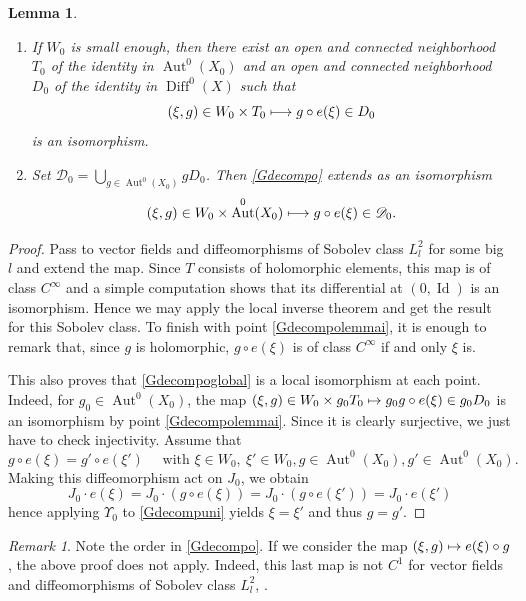 \documentclass[JEP,XML,SOM,Unicode]{cedram}
\let\mathcal\mathscr
\def\mto{\mathchoice{\longmapsto}{\mapsto}{\mapsto}{\mapsto}}
\DeclareMathOperator{\Aut}{Aut}
\DeclareMathOperator{\Diff}{Diff}
\DeclareMathOperator{\Id}{Id}
\theoremstyle{plain}
\newtheorem{lemma}[theorem]{Lemma}
\theoremstyle{definition}
\theoremstyle{remark}
\newtheorem{remark}[theorem]{Remark}
\numberwithin{equation}{section}
\newcommand{\Azero}{\Aut^0(X_0)}
\begin{document}
\skpt
\begin{lemma}
\label{Gdecompolemma}
\begin{enumerate}
\item\label{Gdecompolemmai}
If $W_0$ is small enough, then there exist an open and connected neighborhood~$T_0$ of the identity in $\Aut^0(X_0)$ and an open and connected neighborhood $D_0$ of the identity in $\Diff^0(X)$ such that
\begin{equation}
\label{Gdecompo}
(\xi,g)\in W_0\times T_0\mto g\circ e(\xi)\in D_0
\end{equation}
is an isomorphism.
\item\label{Gdecompolemmaii}
Set $\mathcal D_0=\bigcup_{g\in \Aut^0(X_0)}gD_0$. Then \eqref{Gdecompo} extends as an isomorphism
\begin{equation}
\label{Gdecompoglobal}
(\xi,g)\in W_0\times \Aut^0(X_0)\mto g\circ e(\xi)\in \mathcal D_0.
\end{equation}
\end{enumerate}
\end{lemma}

\begin{proof}
Pass to vector fields and diffeomorphisms of Sobolev class $L^2_l$ for some big~$l$ and extend the map. Since $T$ consists of holomorphic elements, this map is of class $C^\infty$ and a simple computation shows that its differential at $(0, \Id)$ is an isomorphism. Hence we may apply the local inverse theorem and get the result for this Sobolev class. To finish with point \eqref{Gdecompolemmai}, it is enough to remark that, since $g$ is holomorphic, $g\circ e(\xi)$ is of class $C^\infty$ if and only $\xi$ is.

This also proves that \eqref{Gdecompoglobal} is a local isomorphism at each point. Indeed, for $g_0\in \Azero$, the map $(\xi, g)\in W_0\times g_0T_0\mto g_0g\circ e(\xi)\in g_0D_0$ is an isomorphism by point \eqref{Gdecompolemmai}. Since it is clearly surjective, we just have to check injectivity. Assume that
\[
g\circ e(\xi)=g'\circ e(\xi')\quad\text{ with }\xi\in W_0,\ \xi'\in W_0, g\in \Aut^0(X_0), g'\in \Aut^0(X_0).
\]
Making this diffeomorphism act on $J_0$, we obtain
\begin{equation}
\label{Gdecompuni}
J_0\cdot e(\xi)=J_0\cdot (g\circ e(\xi))=J_0\cdot (g\circ e(\xi'))=J_0\cdot e(\xi')
\end{equation}
hence applying $\Upsilon_0$ to \eqref{Gdecompuni} yields $\xi=\xi'$ and thus $g=g'$.
\end{proof}
\begin{remark}
\label{noncommutatif}
Note the order in \eqref{Gdecompo}. If we consider the map $(\xi,g)\mto e(\xi)\circ g$, the above proof does not apply. Indeed, this last map is not $C^1$ for vector fields and diffeomorphisms of Sobolev class $L^2_l$, \cf \cite[Ex.\,I.4.4.5]{Hamilton}.
\end{remark}
\end{document}
